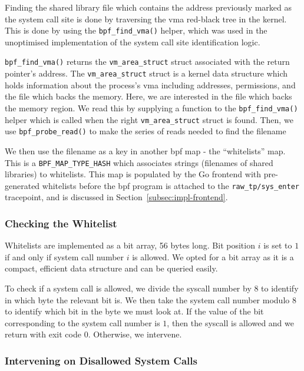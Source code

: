 Finding the shared library file which contains the address previously marked as
the system call site is done by traversing the \ac{vma} red-black tree in the
kernel. This is done by using the \texttt{bpf\_find\_vma()} helper, which was used
in the unoptimised implementation of the system call site identification logic.

\texttt{bpf\_find\_vma()} returns the \texttt{vm\_area\_struct} struct associated with the
return pointer's address. The \texttt{vm\_area\_struct} struct is a kernel data structure
which holds information about the process's \ac{vma} including addresses,
permissions, and the file which backs the memory. Here, we are interested in the
file which backs the memory region. We read this by supplying a function
to the \texttt{bpf\_find\_vma()} helper which is called when the right
\texttt{vm\_area\_struct} struct is found. Then, we use \texttt{bpf\_probe\_read()} to make
the series of reads needed to find the filename

We then use the filename as a key in another \ac{bpf} map - the ``whitelists''
map. This is a \texttt{BPF\_MAP\_TYPE\_HASH} which associates strings (filenames
of shared libraries) to whitelists. This map is populated by the Go frontend
with pre-generated whitelists before the \ac{bpf} program is attached to the 
\texttt{raw\_tp/sys\_enter} tracepoint, and is discussed in 
Section~\ref{subsec:impl-frontend}.

\subsubsection{Checking the Whitelist}

Whitelists are implemented as a bit array, 56 bytes long. Bit position $i$ is
set to $1$ if and only if system call number $i$ is allowed. We opted for a bit
array as it is a compact, efficient data structure and can be queried easily.

To check if a system call is allowed, we divide the syscall number by 8 to identify in 
which byte the relevant bit is. We then take the system call number modulo 8 to
identify which bit in the byte we must look at. If the value of the bit
corresponding to the system call number is $1$, then the syscall is allowed and we
return with exit code 0. Otherwise, we intervene.

\subsubsection{Intervening on Disallowed System Calls}\label{subsubsec:impl-intervening}

